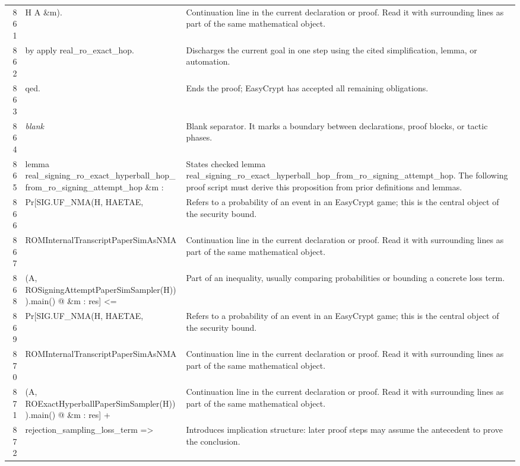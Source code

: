 \documentclass[10pt]{article}
\begin{document}
\begin{longtable}{r L{0.53\textwidth} L{0.37\textwidth}}
861 & {\ttfamily\scriptsize             H A \&m).} & Continuation line in the current declaration or proof.  Read it with surrounding lines as part of the same mathematical object. \\
862 & {\ttfamily\scriptsize by apply real\_ro\_exact\_hop.} & Discharges the current goal in one step using the cited simplification, lemma, or automation. \\
863 & {\ttfamily\scriptsize qed.} & Ends the proof; EasyCrypt has accepted all remaining obligations. \\
864 & {\ttfamily\scriptsize \emph{blank}} & Blank separator.  It marks a boundary between declarations, proof blocks, or tactic phases. \\
865 & {\ttfamily\scriptsize lemma real\_signing\_ro\_exact\_hyperball\_hop\_from\_ro\_signing\_attempt\_hop \&m :} & States checked lemma real\_signing\_ro\_exact\_hyperball\_hop\_from\_ro\_signing\_attempt\_hop.  The following proof script must derive this proposition from prior definitions and lemmas. \\
866 & {\ttfamily\scriptsize   Pr[SIG.UF\_NMA(H, HAETAE,} & Refers to a probability of an event in an EasyCrypt game; this is the central object of the security bound. \\
867 & {\ttfamily\scriptsize        ROMInternalTranscriptPaperSimAsNMA} & Continuation line in the current declaration or proof.  Read it with surrounding lines as part of the same mathematical object. \\
868 & {\ttfamily\scriptsize          (A, ROSigningAttemptPaperSimSampler(H))).main() @ \&m : res] <=} & Part of an inequality, usually comparing probabilities or bounding a concrete loss term. \\
869 & {\ttfamily\scriptsize   Pr[SIG.UF\_NMA(H, HAETAE,} & Refers to a probability of an event in an EasyCrypt game; this is the central object of the security bound. \\
870 & {\ttfamily\scriptsize        ROMInternalTranscriptPaperSimAsNMA} & Continuation line in the current declaration or proof.  Read it with surrounding lines as part of the same mathematical object. \\
871 & {\ttfamily\scriptsize          (A, ROExactHyperballPaperSimSampler(H))).main() @ \&m : res] +} & Continuation line in the current declaration or proof.  Read it with surrounding lines as part of the same mathematical object. \\
872 & {\ttfamily\scriptsize     rejection\_sampling\_loss\_term =>} & Introduces implication structure: later proof steps may assume the antecedent to prove the conclusion. \\

\end{longtable}
\end{document}
